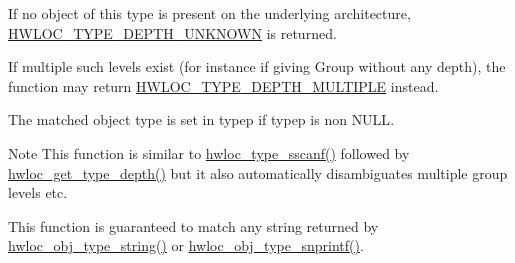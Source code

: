 If no object of this type is present on the underlying architecture, \hyperlink{a00187_ggaf4e663cf42bbe20756b849c6293ef575a0565ab92ab72cb0cec91e23003294aad}{H\+W\+L\+O\+C\+\_\+\+T\+Y\+P\+E\+\_\+\+D\+E\+P\+T\+H\+\_\+\+U\+N\+K\+N\+O\+WN} is returned.

If multiple such levels exist (for instance if giving Group without any depth), the function may return \hyperlink{a00187_ggaf4e663cf42bbe20756b849c6293ef575ae99465995cacde6c210d5fc2e409798c}{H\+W\+L\+O\+C\+\_\+\+T\+Y\+P\+E\+\_\+\+D\+E\+P\+T\+H\+\_\+\+M\+U\+L\+T\+I\+P\+LE} instead.

The matched object type is set in {\ttfamily typep} if {\ttfamily typep} is non {\ttfamily N\+U\+LL}.

\begin{DoxyNote}{Note}
This function is similar to \hyperlink{a00188_ga510f21b066fba2dab12b8c9b173b1dfd}{hwloc\+\_\+type\+\_\+sscanf()} followed by \hyperlink{a00187_ga8bec782e21be313750da70cf7428b374}{hwloc\+\_\+get\+\_\+type\+\_\+depth()} but it also automatically disambiguates multiple group levels etc.

This function is guaranteed to match any string returned by \hyperlink{a00188_ga5ca0bf94bbbb080d0eff17a57bd90422}{hwloc\+\_\+obj\+\_\+type\+\_\+string()} or \hyperlink{a00188_gadb8765c260edea80c52cd06a76639ba4}{hwloc\+\_\+obj\+\_\+type\+\_\+snprintf()}. 
\end{DoxyNote}
